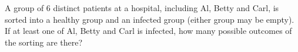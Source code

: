 A group of $6$ distinct patients at a hospital, including Al, Betty and Carl, is sorted into a healthy group and an infected group (either group may be empty). If at least one of Al, Betty and Carl is infected, how many possible outcomes of the sorting are there?
